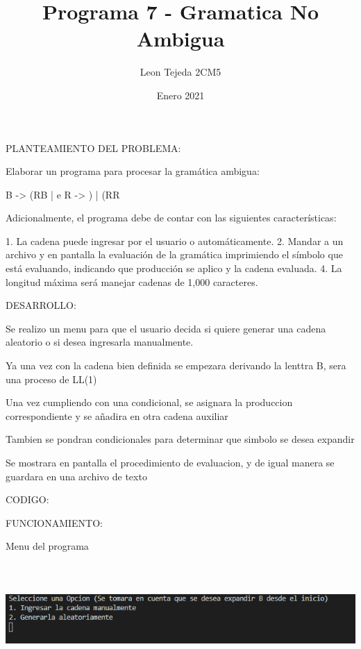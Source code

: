 \documentclass[a4paper]{report}
\title{Programa 7 - Gramatica No Ambigua}
\author{Leon Tejeda 2CM5}
\date{Enero 2021}
\begin{document}
\maketitle
\begin{flushleft}
PLANTEAMIENTO DEL PROBLEMA:

Elaborar un programa para procesar la gramática ambigua:

B -> (RB | e
R -> ) | (RR

Adicionalmente, el programa debe de contar con las siguientes características:

1. La cadena puede ingresar por el usuario o automáticamente.
2. Mandar a un archivo y en pantalla la evaluación de la gramática imprimiendo el símbolo que está evaluando, indicando que producción se aplico y la cadena evaluada.
4. La longitud máxima será manejar cadenas de 1,000 caracteres.

DESARROLLO:

Se realizo un menu para que el usuario decida si quiere generar una cadena aleatorio o si desea ingresarla manualmente.

Ya una vez con la cadena bien definida se empezara derivando la lenttra B, sera una proceso de LL(1)

Una vez cumpliendo con una condicional, se asignara la produccion correspondiente y se añadira en otra cadena auxiliar

Tambien se pondran condicionales para determinar que simbolo se desea expandir

Se mostrara en pantalla el procedimiento de evaluacion, y de igual manera se guardara en una archivo de texto

\newpage

CODIGO:



\newpage

FUNCIONAMIENTO:

Menu del programa
\includegraphics[width= 15cm, height= 5cm]{p7-1.png}


\end{flushleft}
\end{document}
